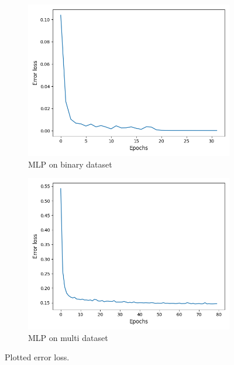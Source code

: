 \documentclass[letterpaper,12pt]{article}
\begin{document}
\begin{figure}[h]
\centering
\begin{subfigure}{.5\textwidth}
  \centering
  \includegraphics[width=\textwidth]{report/figures/binary_error_loss.png}
  \caption{MLP on binary dataset}
  \label{fig:binary_error_loss}
\end{subfigure}%
\begin{subfigure}{.5\textwidth}
  \centering
  \includegraphics[width=\textwidth]{report/figures/multi_error_loss.png}
  \caption{MLP on multi dataset}
  \label{fig:multi_error_loss}
\end{subfigure}
\caption{\label{fig:error_loss}Plotted error loss.}
\end{figure}
\end{document}
